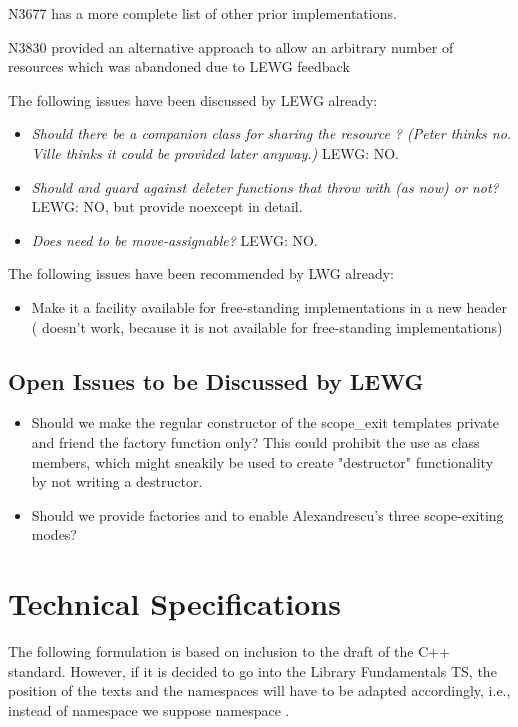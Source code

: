 \documentclass[ebook,11pt,article]{memoir}
\begin{document}
N3677 has a more complete list of other prior implementations.

N3830 provided an alternative approach to allow an arbitrary number of resources which was abandoned due to LEWG feedback 

The following issues have been discussed by LEWG already:
\begin{itemize}
\item \textit{Should there be a companion class for sharing the resource  ?  (Peter thinks no. Ville thinks it could be provided later anyway.) } LEWG: NO.
\item \textit{Should  and  guard against deleter functions that throw with  (as now) or not?} LEWG: NO, but provide noexcept in detail.
\item \textit{Does  need to be move-assignable? } LEWG: NO.
\end{itemize}

The following issues have been recommended by LWG already:
\begin{itemize}
\item Make it a facility available for free-standing implementations in a new header  ( doesn't work, because it is not available for free-standing implementations)
\end{itemize}


\section{Open Issues to be Discussed by LEWG}
\begin{itemize}
\item Should we make the regular constructor of the scope_exit templates private and friend the factory function only? This could prohibit the use as class members, which might sneakily be used to create "destructor" functionality by not writing a destructor.
\item Should we provide factories  and  to enable Alexandrescu's three scope-exiting modes?
\end{itemize}


\chapter{Technical Specifications}
The following formulation is based on inclusion to the draft of the C++ standard. However, if it is decided to go into the Library Fundamentals TS, the position of the texts and the namespaces will have to be adapted accordingly, i.e., instead of namespace  we suppose namespace .
\end{document}
